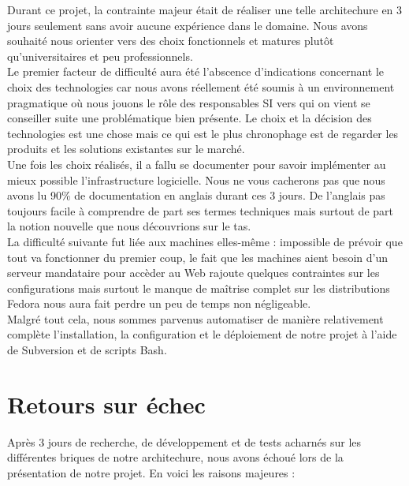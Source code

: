 \documentclass[11pt,a4paper]{report}
\begin{document}
            Durant ce projet, la contrainte majeur était de réaliser une telle architechure en 3 jours seulement sans avoir aucune expérience dans le domaine. Nous avons souhaité nous orienter vers des choix fonctionnels et matures plutôt qu'universitaires et peu professionnels.\\
            
            Le premier facteur de difficulté aura été l'abscence d'indications concernant le choix des technologies car nous avons réellement été soumis à un environnement pragmatique où nous jouons le rôle des responsables SI vers qui on vient se conseiller suite une problématique bien présente.
            Le choix et la décision des technologies est une chose mais ce qui est le plus chronophage est de regarder les produits et les solutions existantes sur le marché.\\
            
            Une fois les choix réalisés, il a fallu se documenter pour savoir implémenter au mieux possible l'infrastructure logicielle. Nous ne vous cacherons pas que nous avons lu 90\% de documentation en anglais durant ces 3 jours. De l'anglais pas toujours facile à comprendre de part ses termes techniques mais surtout de part la notion nouvelle que nous découvrions sur le tas.\\
            
            La difficulté suivante fut liée aux machines elles-même : impossible de prévoir que tout va fonctionner du premier coup, le fait que les machines aient besoin d'un serveur mandataire pour accèder au Web rajoute quelques contraintes sur les configurations mais surtout le manque de maîtrise complet sur les distributions Fedora nous aura fait perdre un peu de temps non négligeable.\\
            
            Malgré tout cela, nous sommes parvenus automatiser de manière relativement complète l'installation, la configuration et le déploiement de notre projet à l'aide de Subversion et de scripts Bash.
        
        \section{Retours sur échec}
        
            Après 3 jours de recherche, de développement et de tests acharnés sur les différentes briques de notre architechure, nous avons échoué lors de la présentation de notre projet. En voici les raisons majeures :\\
            
\end{document}
